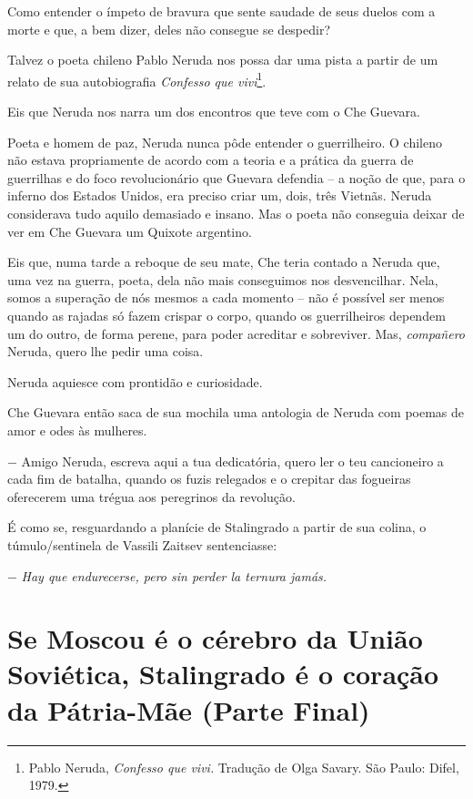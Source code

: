 Como entender o ímpeto de bravura que sente saudade de seus duelos com a
morte e que, a bem dizer, deles não consegue se despedir?

Talvez o poeta chileno Pablo Neruda nos possa dar uma pista a partir de
um relato de sua autobiografia \emph{Confesso que vivi}\footnote{Pablo
  Neruda, \emph{Confesso que vivi.} Tradução de Olga Savary. São Paulo:
  Difel, 1979.}.

Eis que Neruda nos narra um dos encontros que teve com o Che Guevara.

Poeta e homem de paz, Neruda nunca pôde entender o guerrilheiro. O
chileno não estava propriamente de acordo com a teoria e a prática da
guerra de guerrilhas e do foco revolucionário que Guevara defendia -- a
noção de que, para o inferno dos Estados Unidos, era preciso criar um,
dois, três Vietnãs. Neruda considerava tudo aquilo demasiado e insano.
Mas o poeta não conseguia deixar de ver em Che Guevara um Quixote
argentino.

Eis que, numa tarde a reboque de seu mate, Che teria contado a Neruda
que, uma vez na guerra, poeta, dela não mais conseguimos nos
desvencilhar. Nela, somos a superação de nós mesmos a cada momento --
não é possível ser menos quando as rajadas só fazem crispar o corpo,
quando os guerrilheiros dependem um do outro, de forma perene, para
poder acreditar e sobreviver. Mas, \emph{compañero} Neruda, quero lhe
pedir uma coisa.

Neruda aquiesce com prontidão e curiosidade.

Che Guevara então saca de sua mochila uma antologia de Neruda com poemas
de amor e odes às mulheres.

− Amigo Neruda, escreva aqui a tua dedicatória, quero ler o teu
cancioneiro a cada fim de batalha, quando os fuzis relegados e o
crepitar das fogueiras oferecerem uma trégua aos peregrinos da
revolução.

É como se, resguardando a planície de Stalingrado a partir de sua
colina, o túmulo/sentinela de Vassili Zaitsev sentenciasse:

− \emph{Hay que endurecerse, pero sin perder la ternura jamás.}

\chapter*{Se Moscou é o cérebro da União Soviética, Stalingrado é o coração da Pátria-Mãe (Parte Final)}

